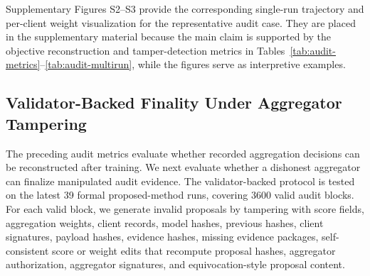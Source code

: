 \documentclass[preprint,12pt]{elsarticle}
\begin{document}
\begin{table}[t]
\centering
\caption{Multi-run auditability summary for latest formal proposed-method runs. Values are mean $\pm$ standard deviation over runs; higher audit rates are better.}
\label{tab:audit-multirun}
\end{table}

Supplementary Figures S2--S3 provide the corresponding single-run trajectory and per-client weight visualization for the representative audit case. They are placed in the supplementary material because the main claim is supported by the objective reconstruction and tamper-detection metrics in Tables~\ref{tab:audit-metrics}--\ref{tab:audit-multirun}, while the figures serve as interpretive examples.

\subsection{Validator-Backed Finality Under Aggregator Tampering}

The preceding audit metrics evaluate whether recorded aggregation decisions can be reconstructed after training. We next evaluate whether a dishonest aggregator can finalize manipulated audit evidence. The validator-backed protocol is tested on the latest 39 formal proposed-method runs, covering 3600 valid audit blocks. For each valid block, we generate invalid proposals by tampering with score fields, aggregation weights, client records, model hashes, previous hashes, client signatures, payload hashes, evidence hashes, missing evidence packages, self-consistent score or weight edits that recompute proposal hashes, aggregator authorization, aggregator signatures, and equivocation-style proposal content.
\end{document}
